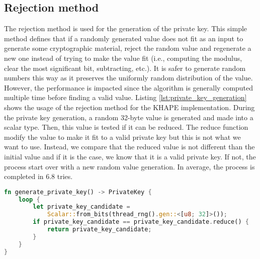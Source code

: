 ﻿\documentclass[../report.tex]{subfiles}
\begin{document}
\subsection{Rejection method}
The rejection method \cite{CAA} is used for the generation of the private key.
This simple method defines that if a randomly generated value does not fit as an input to generate some cryptographic material, reject the random value and regenerate a new one instead of trying to make the value fit (i.e., computing the modulus, clear the most significant bit, subtracting, etc.). 
It is safer to generate random numbers this way as it preserves the uniformly random distribution of the value. However, the performance is impacted since the algorithm is generally computed multiple time before finding a valid value.
Listing \ref{lst:private_key_generation} shows the usage of the rejection method for the KHAPE implementation. During the private key generation, a random 32-byte value is generated and made into a scalar type. Then, this value is tested if it can be reduced. The reduce function modify the value to make it fit to a valid private key but this is not what we want to use.
Instead, we compare that the reduced value is not different than the initial value and if it is the case, we know that it is a valid private key. If not, the process start over with a new random value generation.
In average, the process is completed in 6.8 tries.
\begin{lstlisting}[language=Rust, caption=Private key generation function, label={lst:private_key_generation}]
fn generate_private_key() -> PrivateKey {
    loop {
        let private_key_candidate = 
            Scalar::from_bits(thread_rng().gen::<[u8; 32]>());
        if private_key_candidate == private_key_candidate.reduce() {
            return private_key_candidate;
        }
    }
}
\end{lstlisting}
\end{document}
